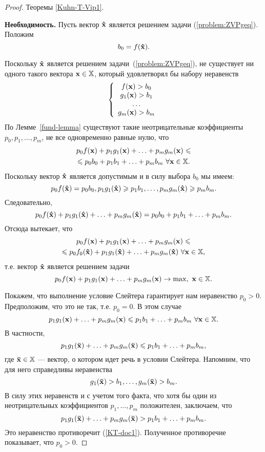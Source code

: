 \begin{proof} Теоремы \ref{Kuhn-T-Vip1}.

    \textbf{Необходимость.}
    Пусть вектор $\mathbf{\hat x}$ является решением задачи (\ref{problem:ZVPgeq}). Положим
\[
    b_{0}=f(\mathbf{\hat x}).
\]


    Поскольку $\mathbf{\hat x}$ является решением
    задачи~(\ref{problem:ZVPgeq}), не существует ни одного такого
    вектора $\mathbf{x}\in\mathbb{X}$, который удовлетворял бы набору
    неравенств
\[
\left\{
    \begin{array}{c}
      f(\mathbf{x})>b_{0} \\
      g_{1}(\mathbf{x})>b_{1} \\
      \ldots \\
      g_{m}(\mathbf{x})>b_{m}
    \end{array}
\right.
\]
    По Лемме~\ref{fund-lemma} существуют такие неотрицательные
коэффициенты $p_0, p_1, \ldots, p_m$, не все одновременно равные
нулю, что
\begin{multline}\label{KT-doc1}
 p_0 f(\mathbf{x}) + p_1 g_1(\mathbf{x})+ \ldots + p_m g_m(\mathbf{x})\leqslant \\
 \leqslant p_{0}b_{0}+p_{1}b_{1}+\ldots+p_{m}b_{m}
 \ \forall\mathbf{x} \in \mathbb{X}.
\end{multline}
    Поскольку вектор $\mathbf{\hat{x}}$ является допустимым и в силу
    выбора $b_{0}$ мы имеем:
\[
    p_0 f(\mathbf{\hat{x}})=p_{0}b_{0},
    p_1 g_1(\mathbf{\hat{x}})\geqslant p_{1}b_{1},\ldots,p_m g_m(\mathbf{\hat{x}})
    \geqslant p_{m}b_{m}.
\]
    Следовательно,
\[
    p_0 f(\mathbf{\hat{x}}) + p_1 g_1(\mathbf{\hat{x}})+ \ldots + p_m g_m(\mathbf{\hat{x}})
    = p_{0}b_{0}+p_{1}b_{1}+\ldots+p_{m}b_{m}.
\]
    Отсюда вытекает, что
\begin{multline*}
    p_0 f(\mathbf{x}) + p_1 g_1(\mathbf{x})+ \ldots + p_m g_m(\mathbf{x})
    \leqslant \\
    \leqslant p_0 f_0(\mathbf{\hat{x}}) + p_1 g_1(\mathbf{\hat{x}})+ \ldots
    + p_m g_m(\mathbf{\hat{x}})
 \ \forall\mathbf{x} \in \mathbb{X},
\end{multline*}
    т.е. вектор $\mathbf{\hat{x}}$ является решением задачи
\[
    p_0 f(\mathbf{x}) + p_1 g_1(\mathbf{x})+ \ldots
    + p_m g_m(\mathbf{x})\rightarrow\max, \ \mathbf{x} \in \mathbb{X}.
\]




    Покажем, что выполнение условие Слейтера гарантирует нам неравенство
$p_0>0$. Предположим, что это не так, т.е. $p_0=0$. В этом случае
\[
 p_1 g_1(\mathbf{x})+ \ldots + p_m g_m(\mathbf{x})
 \leqslant p_{1}b_{1}+\ldots+p_{m}b_{m}
 \ \forall\mathbf{x} \in \mathbb{X}.
\]
    В частности,
\[
 p_1 g_1(\mathbf{\bar{x}})+ \ldots + p_m g_m(\mathbf{\bar{x}})
 \leqslant p_{1}b_{1}+\ldots+p_{m}b_{m},
\]
    где $\mathbf{\bar{x}}\in \mathbb{X}$ --- вектор, о котором идет речь в
    условии Слейтера. Напомним, что для него справедливы неравенства
\[
    g_1(\mathbf{\bar{x}})>b_{1},\ldots,g_m(\mathbf{\bar{x}})>b_{m}.
\]
    В силу этих неравенств и с учетом того факта, что хотя бы
    один из неотрицательных коэффициентов
    $p_{1},\ldots,p_{m}$ положителен, заключаем, что
\[
    p_1 g_1(\mathbf{\bar{x}})+ \ldots + p_m g_m(\mathbf{\bar{x}})
    > p_{1}b_{1}+\ldots+p_{m}b_{m}.
\]
    Это неравенство противоречит (\ref{KT-doc1}). Полученное противоречие
    показывает, что $p_{0}>0$.




\end{proof}
